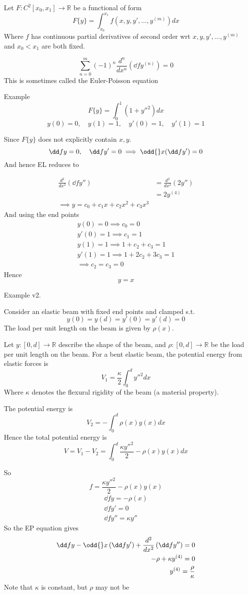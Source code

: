 \documentclass{X:/Documents/Coding/Latex/myassignment}
\begin{document}
Let $F : C^2[x_0,x_1] \to \mathbb{R}$ be a functional of form
\[F\{y\} = \int_{x_0}^{x_1} f(x,y,y',\ldots,y^{(m)}) dx\]
Where $f$ has continuous partial derivatives of second order wrt $x,y,y',\ldots,y^{(m)}$ and $x_0<x_1$ are both fixed.

\[\sum_{n=0}^{m} (-1)^n\frac{d^n}{dx^n} \left(\dd f{y^{(n)}}\right) = 0\]
This is sometimes called the Euler-Poisson equation


Example
\[F\{y\} = \int_0^1 (1+y''^2) dx\]
\[y(0) = 0, \quad y(1) = 1,\quad y'(0) = 1,\quad y'(1) = 1\]

Since $F\{y\}$ does not explicitly contain $x,y$.
\[\dd fy = 0, \quad \dd f{y'} = 0 \implies \odd{}x (\dd f{y'}) = 0\]
And hence EL reduces to

\begin{align*}
	\frac{d^2}{dx^2} \left(\dd f{y''}\right) &= \frac{d^2}{dx^2} (2y'')\\
	&= 2y^{(4)}\\
	\implies y = c_0 + c_1 x + c_2x^2 + c_3x^3
\end{align*}
And using the end points
\begin{align*}
	y(0) = 0 \implies c_0 = 0\\
	y'(0) = 1 \implies c_1 = 1\\
	y(1) = 1 \implies 1 + c_2 + c_3 = 1\\
	y'(1) = 1 \implies 1 + 2c_2 + 3c_3 = 1\\
	\implies c_2=c_3 = 0
\end{align*}
Hence
\[y = x\]

Example v2.

Consider an elastic beam with fixed end points and clamped s.t.
\[y(0) = y(d) = y'(0) = y'(d) = 0\]
The load per unit length on the beam is given by $\rho(x)$.

Let $y : [0,d] \to \mathbb{R}$ describe the shape of the beam, and $\rho : [0,d] \to \mathbb{R}$ be the load per unit length on the beam. For a bent elastic beam, the potential energy from elastic forces is
\[V_1 = \frac{\kappa}{2} \int_0^d y''^2 dx\]
Where $\kappa$ denotes the flexural rigidity of the beam (a material property).

The potential energy is
\[V_2 = - \int_0^d \rho (x) y (x) dx\]
Hence the total potential energy is
\[V = V_1 - V_2 = \int_0^d \frac{\kappa y''^2}{2} - \rho(x) y(x) dx\]

So 
\[f = \frac{\kappa y''^2}{2} - \rho(x) y(x) \]
\begin{align*}
	\dd fy = - \rho(x)\\
	\dd fy' = 0\\
	\dd fy'' = \kappa y''
\end{align*}
So the EP equation gives
\begin{align*}
	\dd fy - \odd{}x \left(\dd f{y'}\right) + \frac{d^2}{dx^2}\left(\dd f{y''}\right) = 0\\
	-\rho + \kappa y^{(4)} = 0\\
	y^{(4)} = \frac{\rho}{\kappa}
\end{align*}
Note that $\kappa$ is constant, but $\rho$ may not be
\end{document}
